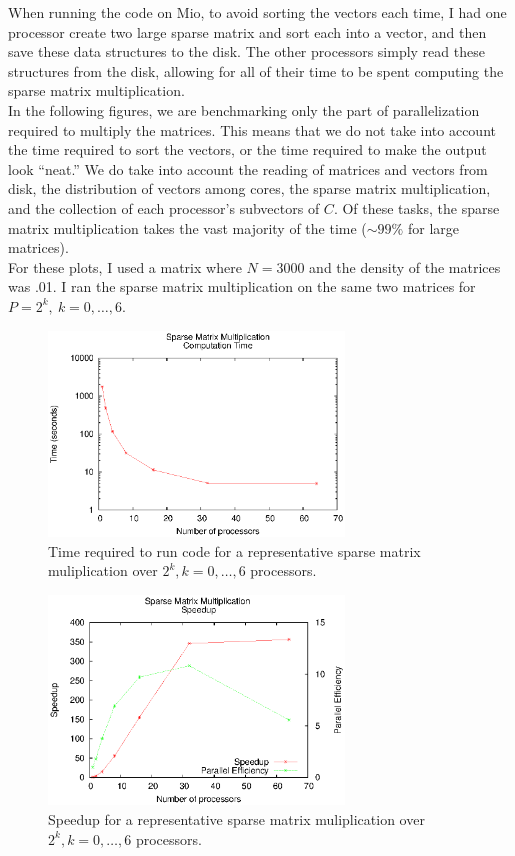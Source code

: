 \documentclass{article}
\begin{document}
When running the code on Mio, to avoid sorting the vectors each time, I had one
processor create two large sparse matrix and sort each into a vector, and then save
these data structures to the disk. The other processors simply read these
structures from the disk, allowing for all of their time to be spent computing
the sparse matrix multiplication. \\

In the following figures, we are benchmarking only the part of parallelization
required to multiply the matrices. This means that we do not take into account
the time required to sort the vectors, or the time required to make the output
look ``neat.'' We do take into account the reading of matrices and vectors from
disk, the distribution of vectors among cores, the sparse matrix multiplication,
and the collection of each processor's subvectors of $C$. Of these tasks, the
sparse matrix multiplication takes the vast majority of the time ($\sim 99\%$
for large matrices). \\

For these plots, I used a matrix where $N=3000$ and the density of the matrices
was .01. I ran the sparse matrix multiplication on the same two matrices for
$P=2^k, \ k=0,  \ldots,  6$. 

\begin{figure}
\centering
\includegraphics[width=0.7\textwidth]{time_plot_3000.eps}
\caption{\label{time} Time required to run code for a representative sparse
matrix muliplication over $2^k, k=0,\ldots,6$ processors.}
\end{figure}

\begin{figure}
\centering
\includegraphics[width=0.7\textwidth]{speedup_plot_3000.eps}
\caption{\label{speedup} Speedup for a representative sparse
matrix muliplication over $2^k, k=0,\ldots,6$ processors.}
\end{figure}
\end{document}
